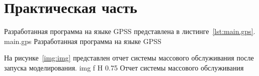 \chapter{Практическая часть}

Разработанная программа на языке GPSS представлена в листинге~\ref{lst:main.gps}.
	{main.gps}
	{Разработанная программа на языке GPSS}

На рисунке~\ref{img:img} представлен отчет системы массового обслуживания после запуска моделирования.
	{img}
	{f}
	{H}
	{0.75\textwidth}
	{Отчет системы массового обслуживания}